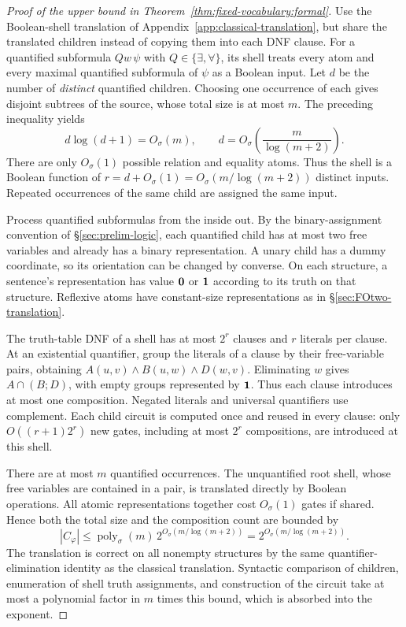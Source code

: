 \begin{proof}[Proof of the upper bound in Theorem~\ref{thm:fixed-vocabulary:formal}]
Use the Boolean-shell translation of
Appendix~\ref{app:classical-translation}, but share the translated
children instead of copying them into each DNF clause.
For a quantified subformula $Qw\,\psi$ with
$Q\in\{\exists,\forall\}$, its shell treats every atom and every
maximal quantified subformula of $\psi$ as a Boolean input.
Let $d$ be the number of \emph{distinct} quantified children.
Choosing one occurrence of each gives disjoint subtrees of the source,
whose total size is at most $m$. The preceding inequality yields
\[
 d\log(d+1)=O_\sigma(m),
 \qquad d=O_\sigma\!\left(\frac{m}{\log(m+2)}\right).
\]
There are only $O_\sigma(1)$ possible relation and equality atoms.
Thus the shell is a Boolean function of
$r=d+O_\sigma(1)=O_\sigma(m/\log(m+2))$ distinct inputs.
Repeated occurrences of the same child are assigned the same input.

Process quantified subformulas from the inside out. By the
binary-assignment convention of \S\ref{sec:prelim-logic}, each
quantified child has at most two free variables and already has a
binary representation. A unary child has a dummy coordinate, so its
orientation can be changed by converse. On each structure, a sentence's
representation has value $\mathbf{0}$ or $\mathbf{1}$ according to its truth on
that structure. Reflexive atoms have constant-size
representations as in \S\ref{sec:FOtwo-translation}.

The truth-table DNF of a shell has at most $2^r$ clauses and $r$
literals per clause. At an existential quantifier, group the literals
of a clause by their free-variable pairs, obtaining
$A(u,v)\land B(u,w)\land D(w,v)$. Eliminating $w$ gives
$A\cap(B;D)$, with empty groups represented by $\mathbf{1}$.
Thus each clause introduces at most one composition.
Negated literals and universal quantifiers use complement.
Each child circuit is computed once and reused in every clause:
only $O((r+1)2^r)$ new gates, including at most $2^r$ compositions,
are introduced at this shell.

There are at most $m$ quantified occurrences. The unquantified root
shell, whose free variables are contained in a pair, is translated
directly by Boolean operations. All atomic representations together
cost $O_\sigma(1)$ gates if shared. Hence both the total size and the
composition count are bounded by
\[
 |C_\varphi|
 \le \operatorname{poly}_\sigma(m)\,
       2^{O_\sigma(m/\log(m+2))}
 =2^{O_\sigma(m/\log(m+2))}.
\]
The translation is correct on all nonempty structures by the same
quantifier-elimination identity as the classical translation.
Syntactic comparison of children, enumeration of shell truth
assignments, and construction of the circuit take at most a polynomial
factor in $m$ times this bound, which is absorbed into the exponent.
\end{proof}

